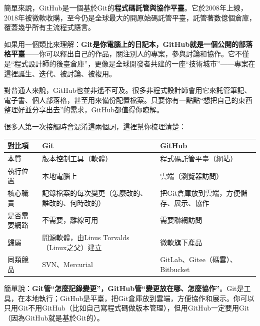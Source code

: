 


簡單來說，GitHub是一個基於Git的\textbf{程式碼託管與協作平臺}。它於2008年上線，2018年被微軟收購，至今仍是全球最大的開原始碼託管平臺，託管著數億個倉庫，覆蓋幾乎所有主流程式語言。

如果用一個類比來理解：\textbf{Git是你電腦上的日記本，GitHub就是一個公開的部落格平臺}——你可以釋出自己的作品，關注別人的專案，參與討論和協作。它不僅是“程式設計師的後臺倉庫”，更像是全球開發者共建的一座“技術城市”——專案在這裡誕生、迭代、被討論、被複用。

對普通人來說，GitHub也並非遙不可及。很多非程式設計師會用它來託管筆記、電子書、個人部落格，甚至用來備份配置檔案。只要你有一點點“想把自己的東西整理好並分享出去”的需求，GitHub都值得你瞭解。


很多人第一次接觸時會混淆這兩個詞，這裡幫你梳理清楚：

\begin{center}
\begin{tabularx}{\linewidth}{|X|X|X|}
\hline
\textbf{對比項} & \textbf{Git} & \textbf{GitHub} \tabularnewline
\hline
本質 & 版本控制工具（軟體） & 程式碼託管平臺（網站） \tabularnewline
執行位置 & 本地電腦上 & 雲端（瀏覽器訪問） \tabularnewline
核心職責 & 記錄檔案的每次變更（怎麼改的、誰改的、何時改的） & 把Git倉庫放到雲端，方便儲存、展示、協作 \tabularnewline
是否需要網路 & 不需要，離線可用 & 需要聯網訪問 \tabularnewline
歸屬 & 開源軟體，由Linus Torvalds（Linux之父）建立 & 微軟旗下產品 \tabularnewline
同類競品 & SVN、Mercurial & GitLab、Gitee（碼雲）、Bitbucket \tabularnewline
\hline
\end{tabularx}
\end{center}

簡單說：\textbf{Git管“怎麼記錄變更”，GitHub管“變更放在哪、怎麼協作”}。Git是工具，在本地執行；GitHub是平臺，把Git倉庫放到雲端，方便協作和展示。你可以只用Git不用GitHub（比如自己寫程式碼做版本管理），但用GitHub一定要用Git（因為GitHub就是基於Git的）。


